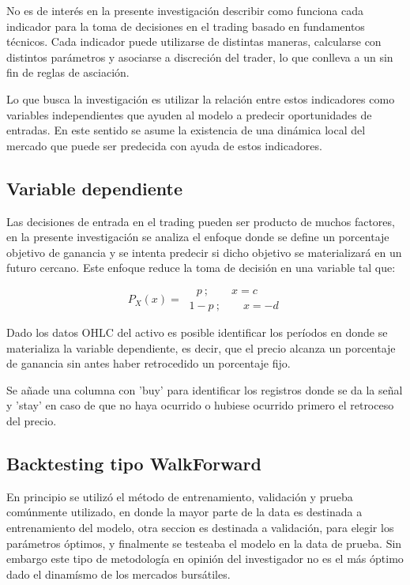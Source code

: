 \documentclass[a4paper,12pt]{Latex/Classes/PhDthesisPSnPDF}
\begin{document}

No es de interés en la presente investigación describir como funciona cada indicador para la toma de decisiones en el trading basado en fundamentos técnicos. Cada indicador puede utilizarse de distintas maneras, calcularse con distintos parámetros y asociarse a discreción del trader, lo que conlleva a un sin fin de reglas de asciación. 

Lo que busca la investigación es utilizar la relación entre estos indicadores como variables independientes que ayuden al modelo a predecir oportunidades de entradas. En este sentido se asume la existencia de una dinámica local del mercado que puede ser predecida con ayuda de estos indicadores.

\subsection{Variable dependiente}

Las decisiones de entrada en el trading pueden ser producto de muchos factores, en la presente investigación se analiza el enfoque donde se define un porcentaje objetivo de ganancia y se intenta predecir si dicho objetivo se materializará en un futuro cercano. Este enfoque reduce la toma de decisión en una variable tal que:

$$
P_{X}(x) = 
\begin{array}{ll} 
\ \ \ \ p \ ; \qquad x = c
\\
\ 1-p \ ; \qquad x = -d
\end{array}
$$

Dado los datos OHLC del activo es posible identificar los períodos en donde se materializa la variable dependiente, es decir, que el precio alcanza un porcentaje de ganancia sin antes haber retrocedido un porcentaje fijo. 

Se añade una columna con 'buy' para identificar los registros donde se da la señal y 'stay' en caso de que no haya ocurrido o hubiese ocurrido primero el retroceso del precio.

\subsection{Backtesting tipo WalkForward}

En principio se utilizó el método de entrenamiento, validación y prueba comúnmente utilizado, en donde la mayor parte de la data es destinada a entrenamiento del modelo, otra seccion es destinada a validación, para elegir los parámetros óptimos, y finalmente se testeaba el modelo en la data de prueba. Sin embargo este tipo de metodología en opinión del investigador no es el más óptimo dado el dinamísmo de los mercados bursátiles. 
\end{document}

